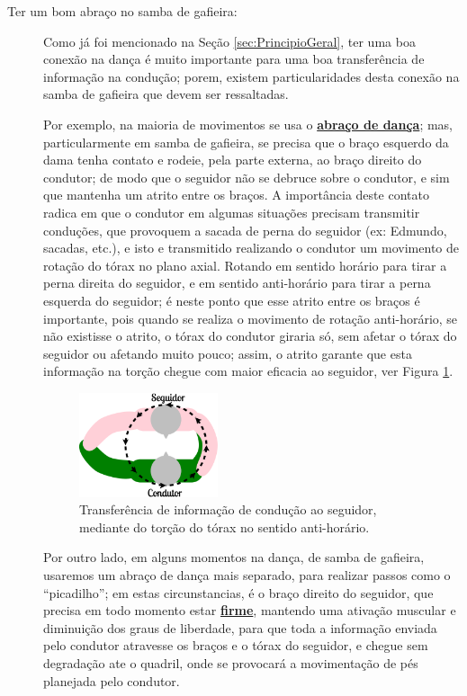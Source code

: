 \begin{description}
\item[Ter um bom abraço no samba de gafieira:] Como já foi mencionado na Seção \ref{sec:PrincipioGeral}, 
ter uma boa conexão na dança é muito importante para uma boa transferência de informação na condução; 
porem, existem particularidades desta conexão na samba de gafieira que devem ser ressaltadas.

Por exemplo, na maioria de movimentos se usa o \hyperref[def:abracodedanca]{\textbf{abraço de dança}};
mas, particularmente em samba de gafieira, se precisa que o braço esquerdo da dama tenha contato
e rodeie, pela parte externa, ao braço direito do condutor; 
de modo  que o seguidor não se debruce sobre o condutor,
e sim que mantenha um atrito entre os braços.
A importância deste contato radica em que o condutor em algumas situações precisam transmitir conduções, 
que provoquem a sacada de perna do seguidor (ex: Edmundo, sacadas, etc.), 
e isto e transmitido realizando o condutor um movimento de rotação do tórax no plano axial.  
Rotando em sentido horário para tirar a perna direita do seguidor, 
e em sentido anti-horário para tirar a perna esquerda do seguidor;
é neste ponto que esse atrito entre os braços é importante, 
pois quando se realiza o movimento de rotação anti-horário, se não existisse o atrito,
o tórax do condutor giraria só, sem afetar o tórax do seguidor ou afetando muito pouco;
assim, o atrito garante que esta informação na torção chegue com maior eficacia ao seguidor,
ver Figura \ref{fig:torcao-abraco}.
\begin{figure}[h]
  \centering
    \includegraphics[width=0.4\textwidth]{chapters/cap-normas/torcao-abraco.eps}
\caption{Transferência de informação de condução ao seguidor, mediante do torção do tórax no sentido anti-horário.}
\label{fig:torcao-abraco}
\end{figure}

Por outro lado, em alguns momentos na dança, de samba de gafieira, usaremos um abraço de dança mais separado,
para realizar passos como o ``picadilho''; em estas circunstancias, é o braço direito do seguidor,
que precisa em todo momento estar \hyperref[def:brazosfirmes]{\textbf{firme}}, 
mantendo uma ativação muscular e diminuição dos graus de liberdade,
para que toda a informação enviada pelo condutor atravesse os braços e o tórax do seguidor,
e chegue sem degradação ate o quadril, onde se provocará a movimentação de pés planejada pelo condutor.


\end{description}
